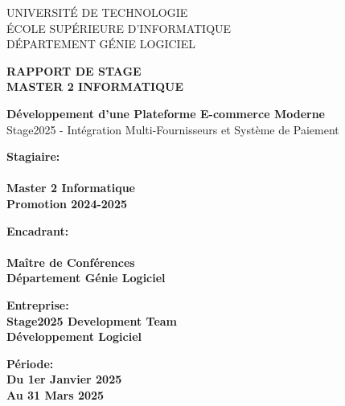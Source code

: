\documentclass[12pt,a4paper]{report}
\begin{document}
\begin{titlepage}
\centering
\vspace*{1cm}

{\Large UNIVERSITÉ DE TECHNOLOGIE}\\[0.3cm]
{\Large ÉCOLE SUPÉRIEURE D'INFORMATIQUE}\\[0.3cm]
{\Large DÉPARTEMENT GÉNIE LOGICIEL}\\[2cm]

\vspace*{1cm}

{\Huge\bfseries RAPPORT DE STAGE}\\[0.5cm]
{\LARGE\bfseries MASTER 2 INFORMATIQUE}\\[1cm]

\vspace*{1cm}

{\Large\bfseries Développement d'une Plateforme E-commerce Moderne}\\[0.3cm]
{\large Stage2025 - Intégration Multi-Fournisseurs et Système de Paiement}\\[2cm]

\vspace*{1cm}

\begin{minipage}{0.45\textwidth}
\begin{flushleft}
\large\bfseries Stagiaire:\\
[Prénom NOM]\\
Master 2 Informatique\\
Promotion 2024-2025
\end{flushleft}
\end{minipage}
\hfill
\begin{minipage}{0.45\textwidth}
\begin{flushright}
\large\bfseries Encadrant:\\
[Dr. Prénom NOM]\\
Maître de Conférences\\
Département Génie Logiciel
\end{flushright}
\end{minipage}

\vfill

\begin{minipage}{0.45\textwidth}
\begin{flushleft}
\large\bfseries Entreprise:\\
Stage2025 Development Team\\
Développement Logiciel
\end{flushleft}
\end{minipage}
\hfill
\begin{minipage}{0.45\textwidth}
\begin{flushright}
\large\bfseries Période:\\
Du 1er Janvier 2025\\
Au 31 Mars 2025
\end{flushright}
\end{minipage}


\end{titlepage}
\end{document}
